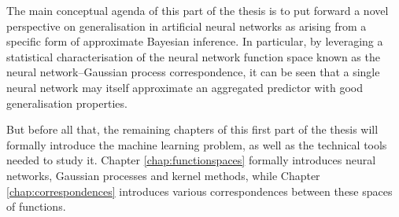\begin{refsection}
The main conceptual agenda of this part of the thesis is to put forward a novel perspective on generalisation in artificial neural networks as arising from a specific form of approximate Bayesian inference. In particular, by leveraging a statistical characterisation of the neural network function space known as the neural network--Gaussian process correspondence, it can be seen that a single neural network may itself approximate an aggregated predictor with good generalisation properties.

But before all that, the remaining chapters of this first part of the thesis will formally introduce the machine learning problem, as well as the technical tools needed to study it. Chapter \ref{chap:functionspaces} formally introduces neural networks, Gaussian processes and kernel methods, while Chapter \ref{chap:correspondences} introduces various correspondences between these spaces of functions.

\printbibliography[heading=subbibliography]
\end{refsection}